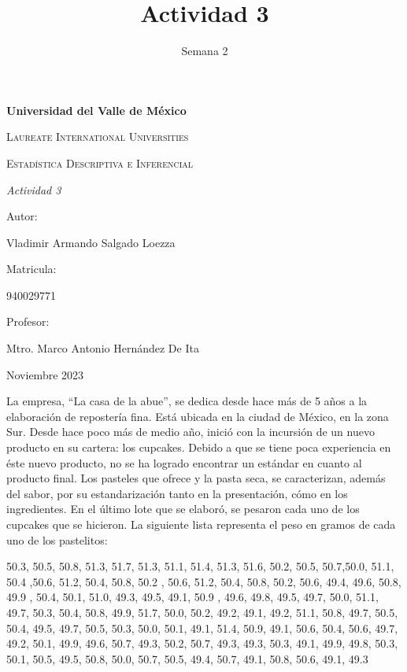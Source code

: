 \documentclass[12pt, letterpaper]{article}
\title{Actividad 3}
\author{}
\date{Semana 2}
\begin{document}
\begin{titlepage}
\centering
{\bfseries\LARGE Universidad del Valle de México \par}
\vspace{1cm}
{\scshape\Large Laureate International Universities  \par}
\vspace{3cm}
{\scshape\Huge Estadística Descriptiva e Inferencial  \par}
\vspace{2cm}
{\itshape\Large Actividad 3  \par}
\vfill
{\small Autor: \par}
{\Large Vladimir Armando Salgado Loezza \par}
\vspace{1cm}
{\small Matricula: \par}
{\Large 940029771\par}
\vspace{1cm}
{\small Profesor: \par}
{\small Mtro. Marco Antonio Hernández De Ita\par}
\vspace{1cm}
{\small Noviembre 2023 \par}
\end{titlepage}
 




 
\maketitle


La empresa, “La casa de la abue”, se dedica desde hace más de 5 años a la
elaboración de repostería fina. Está ubicada en la ciudad de México, en la zona
Sur. Desde hace poco más de medio año, inició con la incursión de un nuevo
producto en su cartera: los cupcakes.
Debido a que se tiene poca experiencia en éste nuevo producto, no se ha logrado
encontrar un estándar en cuanto al producto final. Los pasteles que ofrece y la
pasta seca, se caracterizan, además del sabor, por su estandarización tanto en
la presentación, cómo en los ingredientes.
En el último lote que se elaboró, se pesaron cada uno de los cupcakes que se
hicieron. La siguiente lista representa el peso en gramos de cada uno de los
pastelitos:
\begin{center}
 
50.3, 50.5, 50.8, 51.3, 51.7, 51.3, 51.1, 51.4, 51.3, 51.6, 50.2, 50.5,
50.7,50.0, 51.1, 50.4 ,50.6, 51.2, 50.4, 50.8, 50.2 , 50.6, 51.2, 50.4,
50.8, 50.2, 50.6, 49.4, 49.6, 50.8, 49.9 , 50.4, 50.1, 51.0, 49.3, 49.5,
49.1, 50.9 , 49.6, 49.8, 49.5, 49.7, 50.0, 51.1, 49.7, 50.3, 50.4, 50.8, 49.9,
51.7, 50.0, 50.2, 49.2, 49.1, 49.2, 51.1, 50.8, 49.7, 50.5, 50.4, 49.5, 49.7,
50.5, 50.3, 50.0, 50.1, 49.1, 51.4, 50.9, 49.1, 50.6, 50.4, 50.6, 49.7,
49.2, 50.1, 49.9, 49.6, 50.7, 49.3, 50.2, 50.7, 49.3, 49.3, 50.3, 49.1, 49.9,
49.8, 50.3, 50.1, 50.5, 49.5, 50.8, 50.0, 50.7, 50.5, 49.4, 50.7, 49.1,
50.8, 50.6, 49.1, 49.3

\end{center}
    \newpage
\end{document}
